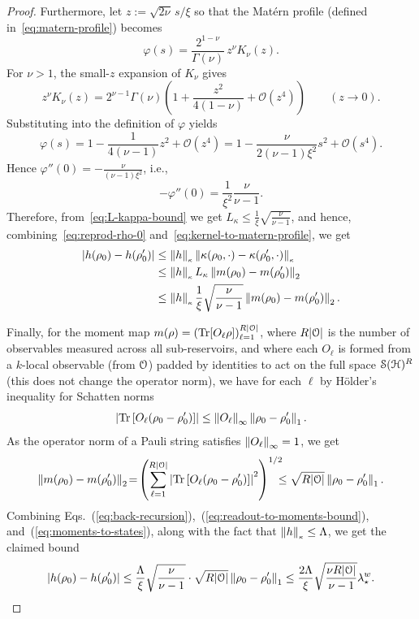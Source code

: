 \begin{proof}
   
Furthermore, let $z := \sqrt{2\nu}\,s/\xi$ so that the Mat\'ern profile (defined in~\cref{eq:matern-profile}) becomes
\[
\varphi(s)=\frac{2^{1-\nu}}{\Gamma(\nu)}\, z^\nu K_\nu(z).
\]
For $\nu>1$, the small-$z$ expansion of $K_\nu$ gives
\[
z^\nu K_\nu(z)=2^{\nu-1}\Gamma(\nu)\left(1+\frac{z^2}{4(1-\nu)}+\mathcal{O}(z^4)\right)\qquad(z\to 0).
\]
Substituting into the definition of $\varphi$ yields
\[
\varphi(s)=1-\frac{1}{4(\nu-1)}z^2+\mathcal{O}(z^4)
=1-\frac{\nu}{2(\nu-1)\xi^2}s^2+\mathcal{O}(s^4).
\]
Hence $\varphi''(0)=-\frac{\nu}{(\nu-1)\xi^2}$, i.e.,
\[
-\varphi''(0)=\frac{1}{\xi^2}\frac{\nu}{\nu-1}.
\]
Therefore, from~\cref{eq:L-kappa-bound} we get $L_\kappa \leq \tfrac{1}{\xi} \sqrt{\tfrac{\nu}{\nu - 1}}$, and hence,
combining~\cref{eq:reprod-rho-0} and~\cref{eq:kernel-to-matern-profile}, we get
\begin{equation}\label{eq:readout-to-moments-bound}
\begin{aligned}
    \left| h(\rho_0) - h(\rho_0') \right| &\leq \left\lVert h\right\rVert_{\scriptscriptstyle \kappa} \left\lVert\kappa(\rho_0, \cdot) - \kappa(\rho_0', \cdot)\right\rVert_{\scriptscriptstyle \kappa}\\
    &\leq \left\lVert h\right\rVert_{\scriptscriptstyle \kappa} L_\kappa \left\lVert m(\rho_0) - m(\rho'_0)\right\rVert_{2}\\
    &\leq \left\lVert h\right\rVert_{\scriptscriptstyle \kappa} \frac{1}{\xi} \sqrt{\frac{\nu}{\nu - 1}} \left\lVert m(\rho_0) - m(\rho'_0)\right\rVert_{2}.
\end{aligned}       
\end{equation}

Finally, for the moment map $m(\rho) = \left(\operatorname{Tr}[O_\ell \rho]\right)_{\ell = 1}^{R |{\mathcal{O}}|}$, where $R |{\mathcal{O}}|$ is the number of observables measured across all sub-reservoirs, and where each $O_\ell$ is formed from a $k$-local observable (from ${\mathcal{O}}$) padded by identities to act on the full space ${\mathcal{S}}({\mathcal{H}})^R$ (this does not change the operator norm), we have for each $\ell$ by H\"older's inequality for Schatten norms
\begin{equation}
    \left| \operatorname{Tr}\left[O_\ell (\rho_0 - \rho'_0)\right] \right| \leq \left\lVert O_\ell\right\rVert_{\infty} \left\lVert\rho_0 - \rho'_0\right\rVert_{1}.
\end{equation}
As the operator norm of a Pauli string satisfies $\left\lVert O_\ell\right\rVert_\infty = 1$, we get
\begin{equation}\label{eq:moments-to-states}
    \left\lVert m(\rho_0) - m(\rho'_0)\right\rVert_{2} \!=\! \left(\sum_{\ell=1}^{R |{\mathcal{O}}|} \left| \operatorname{Tr}\left[O_\ell (\rho_0 - \rho'_0)\right] \right|^2 \right)^{1/2} \!\!\!\! \leq \sqrt{R |{\mathcal{O}}|} \left\lVert\rho_0 - \rho'_0\right\rVert_{1}.
\end{equation}
Combining Eqs.~(\ref{eq:back-recursion}),~(\ref{eq:readout-to-moments-bound}), and~(\ref{eq:moments-to-states}), along with the fact that $\left\lVert h\right\rVert_{\scriptscriptstyle \kappa} \leq \Lambda$, we get the claimed bound
\begin{equation*}
    \left| h(\rho_0) - h(\rho_0') \right| \leq \frac{\Lambda}{\xi} \sqrt{\frac{\nu}{\nu - 1}} \cdot \sqrt{R |{\mathcal{O}}|} \left\lVert\rho_0 - \rho'_0\right\rVert_{1} \leq \frac{2 \Lambda}{\xi} \sqrt{\frac{\nu R |{\mathcal{O}}|}{\nu - 1}} \lambda_\star^w.
\end{equation*}
\end{proof}


